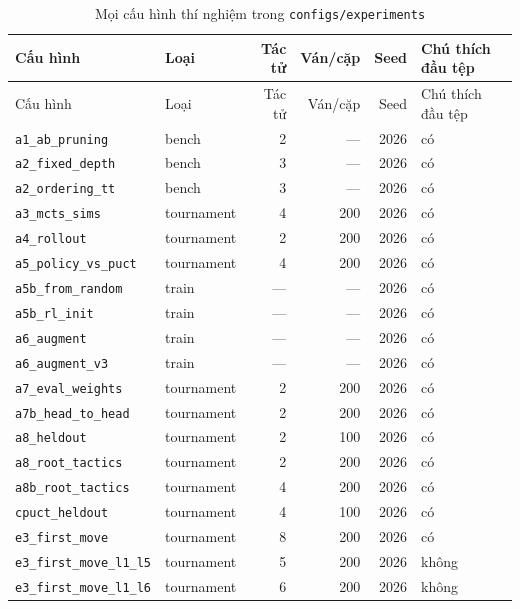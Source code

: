 \par{\footnotesize
\renewcommand{\arraystretch}{0.95}
\begin{longtable}{llrrrl}
  \caption{Mọi cấu hình thí nghiệm trong \texttt{configs/experiments}}\label{tab:cs-cau-hinh}\\
    \toprule
    Cấu hình & Loại & Tác tử & Ván/cặp & Seed & Chú thích đầu tệp \\
    \midrule
  \endfirsthead
    \toprule
    Cấu hình & Loại & Tác tử & Ván/cặp & Seed & Chú thích đầu tệp \\
    \midrule
  \endhead
    \bottomrule
  \endfoot
    \texttt{a1\_ab\_pruning} & bench & 2 & --- & 2026 & có \\
    \texttt{a2\_fixed\_depth} & bench & 3 & --- & 2026 & có \\
    \texttt{a2\_ordering\_tt} & bench & 3 & --- & 2026 & có \\
    \texttt{a3\_mcts\_sims} & tournament & 4 & 200 & 2026 & có \\
    \texttt{a4\_rollout} & tournament & 2 & 200 & 2026 & có \\
    \texttt{a5\_policy\_vs\_puct} & tournament & 4 & 200 & 2026 & có \\
    \texttt{a5b\_from\_random} & train & --- & --- & 2026 & có \\
    \texttt{a5b\_rl\_init} & train & --- & --- & 2026 & có \\
    \texttt{a6\_augment} & train & --- & --- & 2026 & có \\
    \texttt{a6\_augment\_v3} & train & --- & --- & 2026 & có \\
    \texttt{a7\_eval\_weights} & tournament & 2 & 200 & 2026 & có \\
    \texttt{a7b\_head\_to\_head} & tournament & 2 & 200 & 2026 & có \\
    \texttt{a8\_heldout} & tournament & 2 & 100 & 2026 & có \\
    \texttt{a8\_root\_tactics} & tournament & 2 & 200 & 2026 & có \\
    \texttt{a8b\_root\_tactics} & tournament & 4 & 200 & 2026 & có \\
    \texttt{cpuct\_heldout} & tournament & 4 & 100 & 2026 & có \\
    \texttt{e3\_first\_move} & tournament & 8 & 200 & 2026 & có \\
    \texttt{e3\_first\_move\_l1\_l5} & tournament & 5 & 200 & 2026 & không \\
    \texttt{e3\_first\_move\_l1\_l6} & tournament & 6 & 200 & 2026 & không \\

\end{longtable}}
